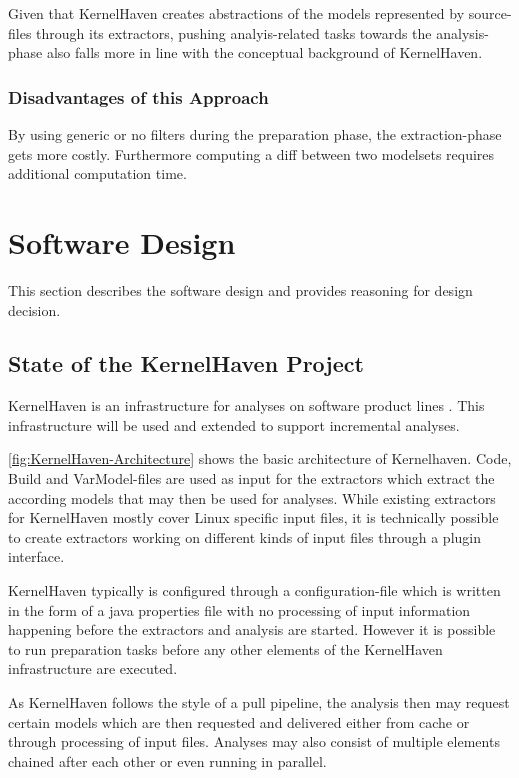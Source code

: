 \documentclass[a4paper]{article}
\begin{document}
Given that KernelHaven creates abstractions of the models represented by source-files through its extractors, pushing analyis-related tasks towards the analysis-phase also falls more in line with the conceptual background of KernelHaven.

\subsubsection{Disadvantages of this Approach}

By using generic or no filters during the preparation phase, the extraction-phase gets more costly. Furthermore computing a diff between two modelsets requires additional computation time.


\clearpage

\section{Software Design}

This section describes the software design and provides reasoning for design decision.

\subsection{State of the KernelHaven Project}

KernelHaven is an infrastructure for analyses on software product lines \cite{KroeherEl-SharkawySchmid18}. This infrastructure will be used and extended to support incremental analyses. 

\autoref{fig:KernelHaven-Architecture} shows the basic architecture of Kernelhaven. Code, Build and VarModel-files are used as input for the extractors which extract the according models that may then be used for analyses. While existing extractors for KernelHaven mostly cover Linux specific input files, it is technically possible to create extractors working on different kinds of input files through a plugin interface.

KernelHaven typically is configured through a configuration-file which is written in the form of a java properties file with no processing of input information happening before the extractors and analysis are started. However it is possible to run preparation tasks before any other elements of the KernelHaven infrastructure are executed.

As KernelHaven follows the style of a pull pipeline, the analysis then may request certain models which are then requested and delivered either from cache or through processing of input files. Analyses may also consist of multiple elements chained after each other or even running in parallel.
\end{document}

